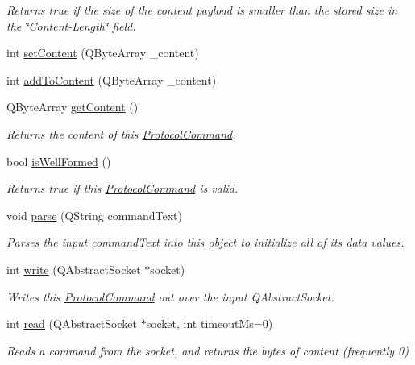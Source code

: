 \begin{DoxyCompactItemize}
\begin{DoxyCompactList}\small\item\em Returns true if the size of the content payload is smaller than the stored size in the \char`\"{}\-Content-\/\-Length\char`\"{} field. \end{DoxyCompactList}\item 
int \hyperlink{struct_picto_1_1_protocol_command_ae1b43ba627c6c89f9ca35084e72eb49e}{set\-Content} (Q\-Byte\-Array \-\_\-content)
\item 
int \hyperlink{struct_picto_1_1_protocol_command_a84e174835f6504315c42269438f87e54}{add\-To\-Content} (Q\-Byte\-Array \-\_\-content)
\item 
Q\-Byte\-Array \hyperlink{struct_picto_1_1_protocol_command_a9b8e81cf4f3675fef7922d3ad3e13456}{get\-Content} ()
\begin{DoxyCompactList}\small\item\em Returns the content of this \hyperlink{struct_picto_1_1_protocol_command}{Protocol\-Command}. \end{DoxyCompactList}\item 
bool \hyperlink{struct_picto_1_1_protocol_command_aea9dc20cfbb8a0ee0d846eb5fe8cdd8f}{is\-Well\-Formed} ()
\begin{DoxyCompactList}\small\item\em Returns true if this \hyperlink{struct_picto_1_1_protocol_command}{Protocol\-Command} is valid. \end{DoxyCompactList}\item 
\hypertarget{struct_picto_1_1_protocol_command_ad86a5f2aec553f620cebd5072c8a29d3}{void \hyperlink{struct_picto_1_1_protocol_command_ad86a5f2aec553f620cebd5072c8a29d3}{parse} (Q\-String command\-Text)}\label{struct_picto_1_1_protocol_command_ad86a5f2aec553f620cebd5072c8a29d3}

\begin{DoxyCompactList}\small\item\em Parses the input command\-Text into this object to initialize all of its data values. \end{DoxyCompactList}\item 
int \hyperlink{struct_picto_1_1_protocol_command_aa889e2721083fde57ec986115e86870d}{write} (Q\-Abstract\-Socket $\ast$socket)
\begin{DoxyCompactList}\small\item\em Writes this \hyperlink{struct_picto_1_1_protocol_command}{Protocol\-Command} out over the input Q\-Abstract\-Socket. \end{DoxyCompactList}\item 
int \hyperlink{struct_picto_1_1_protocol_command_a0c7bbe0621b85d015c27fd01e842bb87}{read} (Q\-Abstract\-Socket $\ast$socket, int timeout\-Ms=0)
\begin{DoxyCompactList}\small\item\em Reads a command from the socket, and returns the bytes of content (frequently 0) \end{DoxyCompactList}\end{DoxyCompactItemize}


